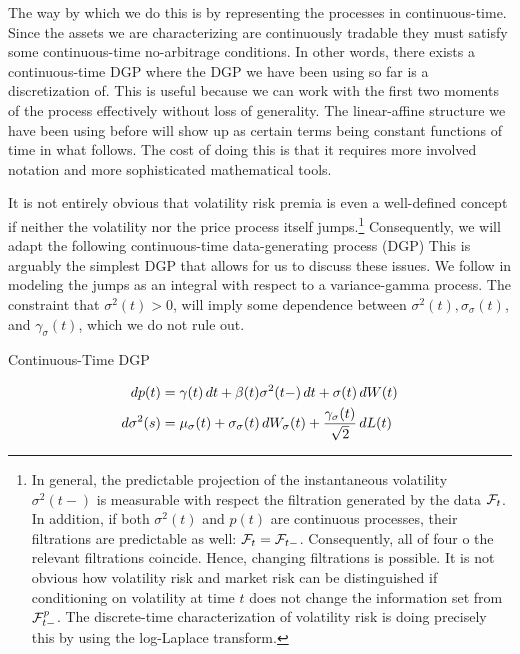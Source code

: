 \documentclass[11pt, letterpaper, twoside, final]{article}
\begin{document}
The way by which we do this is by representing the processes in continuous-time.
Since the assets we are characterizing are continuously tradable they must satisfy some continuous-time
no-arbitrage conditions. 
In other words, there exists a continuous-time DGP where the DGP we have been using so far is a discretization of. 
This is useful because we can work with the first two moments of the process effectively without loss of
generality.
The linear-affine structure we have been using before will show up as certain terms being constant functions of
time in what follows.
The cost of doing this is that it requires more involved notation and more sophisticated mathematical tools.


It is not entirely obvious that volatility risk premia is even a well-defined concept if neither the volatility
nor the price process itself jumps.\footnote{In general, the predictable projection of the instantaneous
    volatility $\sigma^2(t-)$ is measurable with respect the filtration generated by the data $\mathcal{F}_t$. In addition,
    if both $\sigma^2(t)$ and $p(t)$ are continuous processes, their filtrations are predictable as well: $\mathcal{F}_t =
    \mathcal{F}_{t-}$. Consequently, all of four o the relevant filtrations coincide. Hence, changing filtrations is
    possible. It is not obvious how volatility risk and market risk can be distinguished if conditioning on
    volatility at time $t$ does not change the information set from $\mathcal{F}^p_{t-}$. The discrete-time
characterization of volatility risk is doing precisely this by using the log-Laplace transform.}
Consequently, we will adapt the following continuous-time data-generating process (DGP)
This is arguably the simplest DGP that allows for us to discuss these issues. 
We follow \textcite{sangrey2018jumps} in modeling the jumps as an integral with respect to a variance-gamma
process.
The constraint that $\sigma^2(t) > 0$, will imply some dependence between $\sigma^2(t), \sigma_{\sigma}(t)$, and
$\gamma_{\sigma}(t)$, which we do not rule out.



\begin{defn}{Continuous-Time DGP}
    \label{defn:cont_time_dgp}

    \begin{align}
        \mathop{}\!d p(t) &= \gamma(t) \mathop{}\!d t + \beta(t) \sigma^2(t-) \mathop{}\!d t + \sigma(t) \mathop{}\!d W(t)  \\
        \mathop{}\!d \sigma^2(s)  &= \mu_{\sigma}(t) + \sigma_{\sigma}(t) \mathop{}\!d W_{\sigma}(t) +
        \frac{\gamma_{\sigma}(t)}{\sqrt{2}} \mathop{}\!d L(t) 
    \end{align}

\end{defn}
\end{document}
